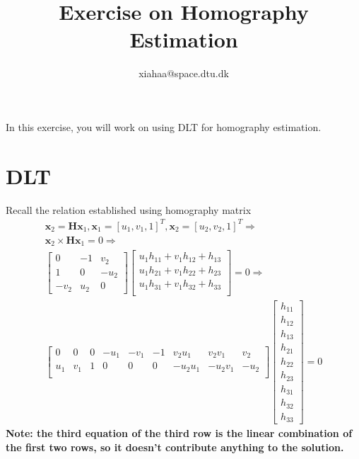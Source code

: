 \documentclass[a4paper]{article}
\begin{document}
\title{Exercise on Homography Estimation}
\author{xiahaa@space.dtu.dk}
\maketitle%

In this exercise, you will work on using DLT for homography estimation.

\section{DLT}
Recall the relation established using homography matrix
\begin{align*}
\mathbf{x}_2 = \mathbf{Hx}_1, \mathbf{x}_1 = [u_1,v_1,1]^T, \mathbf{x}_2 = [u_2,v_2,1]^T \Rightarrow \\
\mathbf{x}_2 \times \mathbf{Hx}_1 = 0 \Rightarrow \\
\left[
\begin{matrix}
0 & -1 & v_2 \\
1 & 0 & -u_2 \\
-v_2 & u_2 & 0
\end{matrix}
\right]
\left[
\begin{matrix}
u_1h_{11}+v_1h_{12}+h_{13}\\
u_1h_{21}+v_1h_{22}+h_{23}\\
u_1h_{31}+v_1h_{32}+h_{33}\\
\end{matrix}
\right]=0 \Rightarrow \\
\left[
\begin{matrix}
0 & 0 & 0 & -u_1 & -v_1 & -1 & v_2u_1 & v_2v_1 & v_2 \\
u_1 & v_1 & 1 & 0 & 0 & 0 & -u_2u_1 & -u_2v_1 & -u_2 \\
\end{matrix}
\right]
\left[
\begin{matrix}
h_{11} \\ h_{12}\\h_{13}\\h_{21}\\h_{22}\\h_{23}\\h_{31}\\h_{32}\\h_{33}
\end{matrix}
\right]=0 
\end{align*}
\textbf{Note: the third equation of the third row is the linear combination of the first two rows, so it doesn't contribute anything to the solution.}
\end{document}
